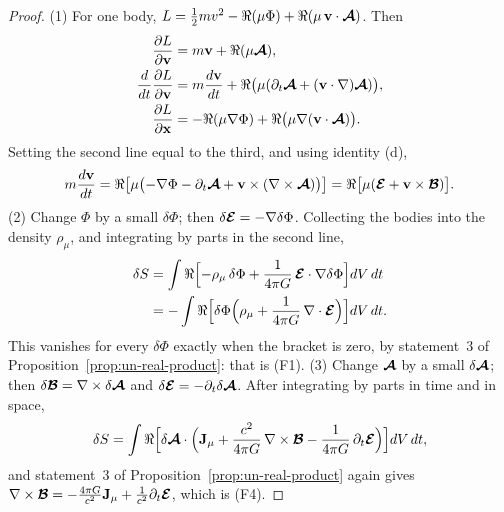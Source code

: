 \begin{proof}
(1) For one body, $L = \tfrac12 m v^2 - \Re(\mu\Phi) + \Re(\mu\,\mathbf{v}\cdot\boldsymbol{\mathcal{A}})$. Then
\begin{align*}
\frac{\partial L}{\partial\mathbf{v}} &= m\mathbf{v} + \Re(\mu\boldsymbol{\mathcal{A}}),\\
\frac{d}{dt}\frac{\partial L}{\partial\mathbf{v}} &= m\frac{d\mathbf{v}}{dt} + \Re\bigl(\mu(\partial_t\boldsymbol{\mathcal{A}} + (\mathbf{v}\cdot\nabla)\boldsymbol{\mathcal{A}})\bigr),\\
\frac{\partial L}{\partial\mathbf{x}} &= -\Re(\mu\nabla\Phi) + \Re\bigl(\mu\nabla(\mathbf{v}\cdot\boldsymbol{\mathcal{A}})\bigr).
\end{align*}
Setting the second line equal to the third, and using identity (d),
\[
m\frac{d\mathbf{v}}{dt} = \Re\bigl[\mu\bigl(-\nabla\Phi - \partial_t\boldsymbol{\mathcal{A}} + \mathbf{v}\times(\nabla\times\boldsymbol{\mathcal{A}})\bigr)\bigr] = \Re\bigl[\mu(\boldsymbol{\mathcal{E}} + \mathbf{v}\times\boldsymbol{\mathcal{B}})\bigr] .
\]
(2) Change $\Phi$ by a small $\delta\Phi$; then $\delta\boldsymbol{\mathcal{E}} = -\nabla\delta\Phi$. Collecting the bodies into the density $\rho_\mu$, and integrating by parts in the second line,
\begin{align*}
\delta S &= \int\Re\Bigl[-\rho_\mu\,\delta\Phi + \frac{1}{4\pi G}\,\boldsymbol{\mathcal{E}}\cdot\nabla\delta\Phi\Bigr]dV\,dt\\
&= -\int\Re\Bigl[\delta\Phi\Bigl(\rho_\mu + \frac{1}{4\pi G}\,\nabla\cdot\boldsymbol{\mathcal{E}}\Bigr)\Bigr]dV\,dt .
\end{align*}
This vanishes for every $\delta\Phi$ exactly when the bracket is zero, by statement~3 of Proposition~\ref{prop:un-real-product}: that is (F1).
(3) Change $\boldsymbol{\mathcal{A}}$ by a small $\delta\boldsymbol{\mathcal{A}}$; then $\delta\boldsymbol{\mathcal{B}} = \nabla\times\delta\boldsymbol{\mathcal{A}}$ and $\delta\boldsymbol{\mathcal{E}} = -\partial_t\delta\boldsymbol{\mathcal{A}}$. After integrating by parts in time and in space,
\[
\delta S = \int\Re\Bigl[\delta\boldsymbol{\mathcal{A}}\cdot\Bigl(\mathbf{J}_\mu + \frac{c^2}{4\pi G}\,\nabla\times\boldsymbol{\mathcal{B}} - \frac{1}{4\pi G}\,\partial_t\boldsymbol{\mathcal{E}}\Bigr)\Bigr]dV\,dt ,
\]
and statement~3 of Proposition~\ref{prop:un-real-product} again gives $\nabla\times\boldsymbol{\mathcal{B}} = -\frac{4\pi G}{c^2}\mathbf{J}_\mu + \frac{1}{c^2}\partial_t\boldsymbol{\mathcal{E}}$, which is (F4).
\end{proof}


